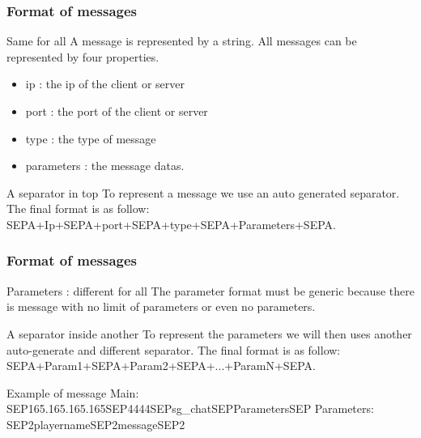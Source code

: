 \documentclass[9pt]{beamer}
\begin{document}
\begin{frame}
	\frametitle{Format of messages}
	\begin{block}{Same for all}
		A message is represented by a string.
		All messages can be represented by four properties.
		\begin{itemize}
			\item ip : the ip of the client or server
			\item port : the port of the client or server
			\item type : the type of message
			\item parameters : the message datas.
		\end{itemize}
	\end{block}
	\begin{block}{A separator in top}
		To represent a message we use an auto generated separator.
		The final format is as follow:
		SEPA+Ip+SEPA+port+SEPA+type+SEPA+Parameters+SEPA.
	\end{block}
	\transdissolve
\end{frame}

\begin{frame}
	\frametitle{Format of messages}

	\begin{block}{Parameters : different for all}
		The parameter format must be generic because there is message with no limit of parameters or even no parameters.
	\end{block}

	\begin{block}{A separator inside another}
		To represent the parameters we will then uses another auto-generate and different separator.
		The final format is as follow:
		SEPA+Param1+SEPA+Param2+SEPA+...+ParamN+SEPA.
	\end{block}

	\begin{block}{Example of message}
		Main: SEP\color{red}165.165.165.165\color{black}SEP\color{red}4444\color{black}SEP\color{red}sg\_chat\color{black}SEP\color{red}Parameters\color{black}SEP
		Parameters: SEP2\color{red}playername\color{black}SEP2\color{red}message\color{black}SEP2
	\end{block}
	\transdissolve
\end{frame}
\end{document}
